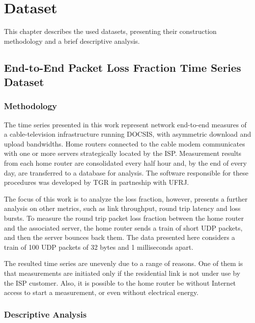 \chapter{Dataset}

This chapter describes the used datasets, presenting their construction methodology and a brief descriptive analysis.

\section{End-to-End Packet Loss Fraction Time Series Dataset}

\subsection{Methodology}

The time series presented in this work represent network end-to-end measures of a cable-television infrastructure running DOCSIS, with asymmetric download and upload bandwidths. Home routers connected to the cable modem communicates with one or more servers strategically located by the ISP. Measurement results from each home router are consolidated every half hour and, by the end of every day, are transferred to a database for analysis. The software responsible for these procedures was developed by TGR in partneship with UFRJ. 

The focus of this work is to analyze the loss fraction, however, \cite{a_preliminary_performance_measurement_study_of_residential_broadband_services_in_brazil} presents a further analysis on other metrics, such as link throughput, round trip latency and loss bursts. To measure the round trip packet loss fraction between the home router and the associated server, the home router sends a train of short UDP packets, and then the server bounces back them. The data presented here considers a train of 100 UDP packets of 32 bytes and 1 milliseconds apart.

The resulted time series are unevenly due to a range of reasons. One of them is that measurements are initiated only if the residential link is not under use by the ISP customer. Also, it is possible to the home router be without Internet access to start a measurement, or even without electrical energy.

\subsection{Descriptive Analysis}

